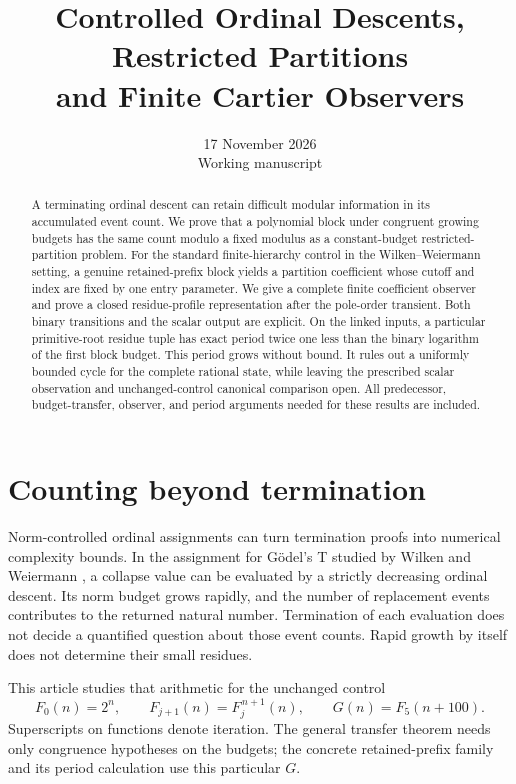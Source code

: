 \documentclass[11pt,a4paper]{article}
\title{Controlled Ordinal Descents, Restricted Partitions\\
and Finite Cartier Observers}
\author{}
\date{17 November 2026\\Working manuscript}
\theoremstyle{definition}
\numberwithin{equation}{section}
\begin{document}
\maketitle
\begin{abstract}
A terminating ordinal descent can retain difficult modular information
in its accumulated event count. We prove that a polynomial block under
congruent growing budgets has the same count modulo a fixed modulus as
a constant-budget restricted-partition problem. For the standard
finite-hierarchy control in the Wilken--Weiermann setting, a genuine
retained-prefix block yields a partition coefficient whose cutoff and
index are fixed by one entry parameter. We give a complete finite
coefficient observer and prove a closed residue-profile representation
after the pole-order transient. Both binary transitions and the scalar
output are explicit. On the linked inputs, a particular primitive-root
residue tuple has exact period twice one less than the binary logarithm
of the first block budget. This period grows without bound. It rules out
a uniformly bounded cycle for the complete rational state, while leaving
the prescribed scalar observation and unchanged-control canonical
comparison open. All predecessor, budget-transfer, observer, and period
arguments needed for these results are included.
\end{abstract}
\begingroup
\small
\tableofcontents
\endgroup
\clearpage

\section{Counting beyond termination}

Norm-controlled ordinal assignments can turn termination proofs into
numerical complexity bounds. In the assignment for G\"odel's T studied
by Wilken and Weiermann \cite{ww}, a collapse value can be evaluated by a
strictly decreasing ordinal descent. Its norm budget grows rapidly, and
the number of replacement events contributes to the returned natural
number. Termination of each evaluation does not decide a quantified
question about those event counts. Rapid growth by itself does not
determine their small residues.

This article studies that arithmetic for the unchanged control
\[
 F_0(n)=2^n,\qquad F_{j+1}(n)=F_j^{\,n+1}(n),\qquad
 G(n)=F_5(n+100).
\]
Superscripts on functions denote iteration. The general transfer theorem
needs only congruence hypotheses on the budgets; the concrete
retained-prefix family and its period calculation use this particular
$G$.
\end{document}
